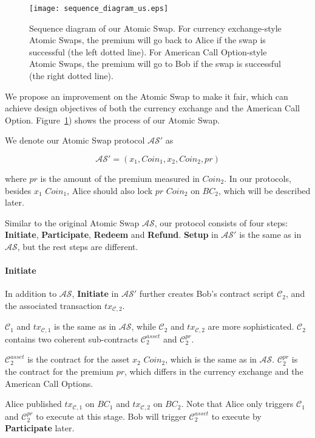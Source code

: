 \begin{figure}
    \texttt{[image: sequence\_diagram\_us.eps]}
    \caption{Sequence diagram of our Atomic Swap.
    For currency exchange-style Atomic Swaps, the premium will go back to Alice if the swap is successful (the left dotted line).
    For American Call Option-style Atomic Swaps, the premium will go to Bob if the swap is successful (the right dotted line).}
    \label{fig:sequence_diagram_us}
\end{figure}

We propose an improvement on the Atomic Swap to make it fair, which can achieve design objectives of both the currency exchange and the American Call Option.
Figure~\ref{fig:sequence_diagram_us}) shows the process of our Atomic Swap.

We denote our Atomic Swap protocol $\mathcal{AS}'$ as

$$\mathcal{AS}' = (x_1, Coin_1, x_2, Coin_2, pr)$$

where $pr$ is the amount of the premium measured in $Coin_2$.
In our protocols, besides $x_1$ $Coin_1$, Alice should also lock $pr$ $Coin_2$ on $BC_2$, which will be described later.

Similar to the original Atomic Swap $\mathcal{AS}$, our protocol consists of four steps:
\textbf{Initiate}, \textbf{Participate}, \textbf{Redeem} and \textbf{Refund}.
\textbf{Setup} in $\mathcal{AS}'$ is the same as in $\mathcal{AS}$, but the rest steps are different. 

\paragraph{\textbf{Initiate}}
In addition to $\mathcal{AS}$, \textbf{Initiate} in $\mathcal{AS}'$ further creates Bob's contract script $\mathcal{C}_2$, and
the associated transaction $tx_{\mathcal{C}, 2}$.

$\mathcal{C}_1$ and $tx_{\mathcal{C}, 1}$ is the same as in $\mathcal{AS}$,
while $\mathcal{C}_2$ and $tx_{\mathcal{C}, 2}$ are more sophisticated.
$\mathcal{C}_2$ contains two coherent sub-contracts $\mathcal{C}^{asset}_2$ and $\mathcal{C}^{pr}_2$.

$\mathcal{C}^{asset}_2$ is the contract for the asset $x_2$ $Coin_2$, which is the same as in $\mathcal{AS}$.
$\mathcal{C}^{pr}_2$ is the contract for the premium $pr$, which differs in the currency exchange and the American Call Options.

Alice published $tx_{\mathcal{C}, 1}$ on $BC_1$ and $tx_{\mathcal{C}, 2}$ on $BC_2$.
Note that Alice only triggers $\mathcal{C}_1$ and $\mathcal{C}^{pr}_2$ to execute at this stage.
Bob will trigger $\mathcal{C}^{asset}_2$ to execute by \textbf{Participate} later.

